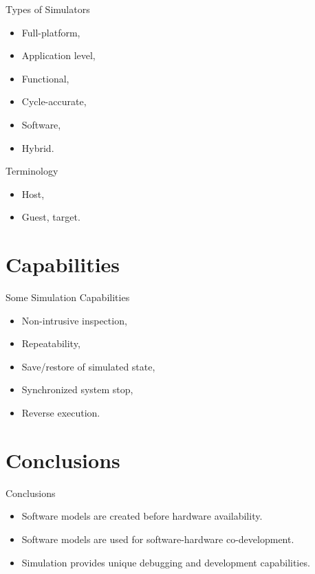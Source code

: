\begin{frame}{Types of Simulators}
\begin{itemize}
\item Full-platform,
\item Application level,
\item Functional,
\item Cycle-accurate,
\item Software,
\item Hybrid.
\end{itemize}
\end{frame}

\begin{frame} {Terminology}
\begin{itemize}
\item Host,
\item Guest, target.
\end{itemize}
\end{frame}

\section{Capabilities}

\begin{frame}{Some Simulation Capabilities}
\begin{itemize}
\item Non-intrusive inspection,
\item Repeatability,
\item Save/restore of simulated state,
\item Synchronized system stop,
\item Reverse execution.
\end{itemize}
\end{frame}

\section{Conclusions}

\begin{frame}{Conclusions}
\begin{itemize}
\item Software models are created before hardware availability.
\item Software models are used for software-hardware co-development.
\item Simulation provides unique debugging and development capabilities.
\end{itemize}
\end{frame}

